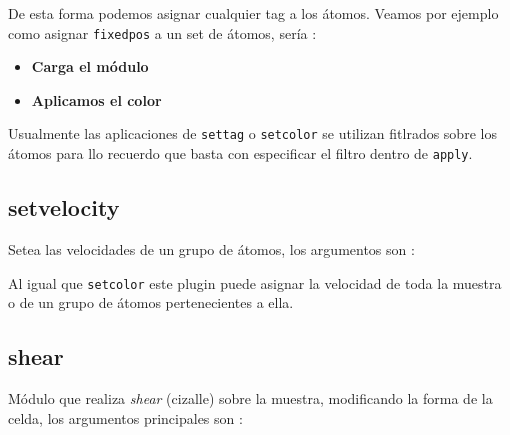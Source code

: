 
De esta forma podemos asignar cualquier tag a los \'atomos. Veamos por ejemplo como asignar \verb|fixedpos| a un set de \'atomos, ser\'ia :

\begin{itemize}
 \item \textbf{Carga el m\'odulo}
 \item \textbf{Aplicamos el color}
\end{itemize}

Usualmente las aplicaciones de \verb|settag| o \verb|setcolor| se utilizan fitlrados sobre los \'atomos para llo recuerdo que basta con especificar el filtro dentro de \verb|apply|.

\subsection{setvelocity}
Setea las velocidades de un grupo de \'atomos, los argumentos son :


Al igual que \verb|setcolor| este plugin puede asignar la velocidad de toda la muestra o de un grupo de \'atomos pertenecientes a ella.

\subsection{shear}
M\'odulo que realiza \textit{shear} (cizalle) sobre la muestra, modificando la forma de la celda, los argumentos principales son :


